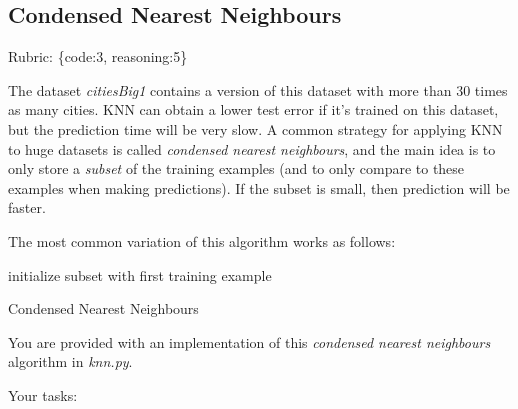 \documentclass{article}
\def\gre#1{{\color{gre}#1}}
\def\rubric#1{\gre{Rubric: \{#1\}}}{}
\begin{document}
\subsection{Condensed Nearest Neighbours}
\rubric{code:3, reasoning:5}

The dataset \emph{citiesBig1} contains a version of this dataset with more than 30 times as many cities. KNN can obtain a lower test error if it's trained on this dataset, but the prediction time will be very slow.
A common strategy for applying KNN to huge datasets is called \emph{condensed nearest neighbours}, and the main idea is to only store a \emph{subset}
of the training examples (and to only compare to these examples when making predictions). If the subset is small, then prediction will be faster.

The most common variation of this algorithm works as follows:

\begin{algorithm}[H]
 initialize subset with first training example\;
 \caption{Condensed Nearest Neighbours}
\end{algorithm}

You are provided with an implementation of this \emph{condensed nearest neighbours} algorithm in \emph{knn.py}.

Your tasks:
\end{document}
